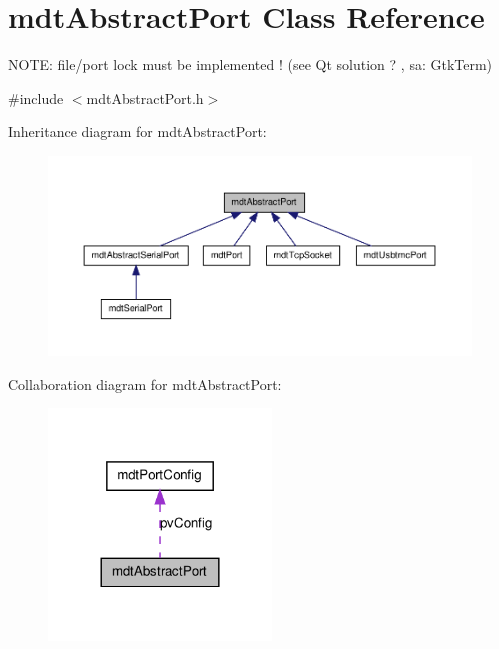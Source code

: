 \hypertarget{classmdt_abstract_port}{
\section{mdtAbstractPort Class Reference}
\label{classmdt_abstract_port}
}


NOTE: file/port lock must be implemented ! (see Qt solution ? , sa: GtkTerm)  




{\ttfamily \#include $<$mdtAbstractPort.h$>$}



Inheritance diagram for mdtAbstractPort:\nopagebreak
\begin{figure}[H]
\begin{center}
\leavevmode
\includegraphics[width=400pt]{classmdt_abstract_port__inherit__graph}
\end{center}
\end{figure}


Collaboration diagram for mdtAbstractPort:\nopagebreak
\begin{figure}[H]
\begin{center}
\leavevmode
\includegraphics[width=168pt]{classmdt_abstract_port__coll__graph}
\end{center}
\end{figure}
